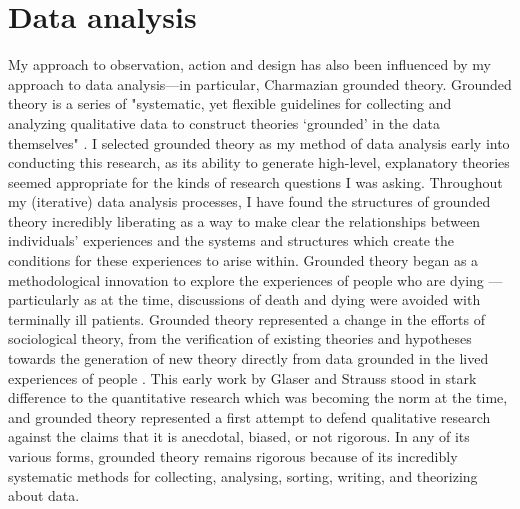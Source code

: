 \section{Data analysis}
\label{sec:3-3-analysis}
My approach to observation, action and design has also been influenced by my approach to data analysis—in particular, Charmazian grounded theory. Grounded theory is a series of "systematic, yet flexible guidelines for collecting and analyzing qualitative data to construct theories `grounded' in the data themselves" \cite[p. 3]{charmaz_constructing_2006}. I selected grounded theory as my method of data analysis early into conducting this research, as its ability to generate high-level, explanatory theories seemed appropriate for the kinds of research questions I was asking. Throughout my (iterative) data analysis processes, I have found the structures of grounded theory incredibly liberating as a way to make clear the relationships between individuals' experiences and the systems and structures which create the conditions for these experiences to arise within. 
Grounded theory began as a methodological innovation to explore the experiences of people who are dying \citep{glaser_awareness_2017}—particularly as at the time, discussions of death and dying were avoided with terminally ill patients. Grounded theory represented a change in the efforts of sociological theory, from the verification of existing theories and hypotheses towards the generation of new theory directly from data grounded in the lived experiences of people \citep{glaser_discovery_2009}. This early work by Glaser and Strauss stood in stark difference to the quantitative research which was becoming the norm at the time, and grounded theory represented a first attempt to defend qualitative research against the claims that it is anecdotal, biased, or not rigorous. In any of its various forms, grounded theory remains rigorous because of its incredibly systematic methods for collecting, analysing, sorting, writing, and theorizing about data. 

